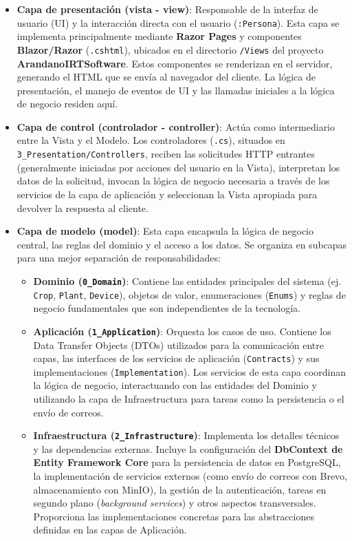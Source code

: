 \begin{itemize}
    \item \textbf{Capa de presentación (vista - view)}: Responsable de la interfaz de usuario (UI) y la interacción directa con el usuario (\texttt{:Persona}). Esta capa se implementa principalmente mediante \textbf{Razor Pages} y componentes \textbf{Blazor/Razor} (\texttt{.cshtml}), ubicados en el directorio \texttt{/Views} del proyecto \textbf{ArandanoIRTSoftware}. Estos componentes se renderizan en el servidor, generando el HTML que se envía al navegador del cliente. La lógica de presentación, el manejo de eventos de UI y las llamadas iniciales a la lógica de negocio residen aquí.

    \item \textbf{Capa de control (controlador - controller)}: Actúa como intermediario entre la Vista y el Modelo. Los controladores (\texttt{.cs}), situados en \texttt{3\_Presentation/Controllers}, reciben las solicitudes HTTP entrantes (generalmente iniciadas por acciones del usuario en la Vista), interpretan los datos de la solicitud, invocan la lógica de negocio necesaria a través de los servicios de la capa de aplicación y seleccionan la Vista apropiada para devolver la respuesta al cliente.

    \item \textbf{Capa de modelo (model)}: Esta capa encapsula la lógica de negocio central, las reglas del dominio y el acceso a los datos. Se organiza en subcapas para una mejor separación de responsabilidades:
        \begin{itemize}
            \item \textbf{Dominio (\texttt{0\_Domain})}: Contiene las entidades principales del sistema (ej. \texttt{Crop}, \texttt{Plant}, \texttt{Device}), objetos de valor, enumeraciones (\texttt{Enums}) y reglas de negocio fundamentales que son independientes de la tecnología.
            \item \textbf{Aplicación (\texttt{1\_Application})}: Orquesta los casos de uso. Contiene los Data Transfer Objects (DTOs) utilizados para la comunicación entre capas, las interfaces de los servicios de aplicación (\texttt{Contracts}) y sus implementaciones (\texttt{Implementation}). Los servicios de esta capa coordinan la lógica de negocio, interactuando con las entidades del Dominio y utilizando la capa de Infraestructura para tareas como la persistencia o el envío de correos.
            \item \textbf{Infraestructura (\texttt{2\_Infrastructure})}: Implementa los detalles técnicos y las dependencias externas. Incluye la configuración del \textbf{DbContext de Entity Framework Core} para la persistencia de datos en PostgreSQL, la implementación de servicios externos (como envío de correos con Brevo, almacenamiento con MinIO), la gestión de la autenticación, tareas en segundo plano (\textit{background services}) y otros aspectos transversales. Proporciona las implementaciones concretas para las abstracciones definidas en las capas de Aplicación.
        \end{itemize}
\end{itemize}

